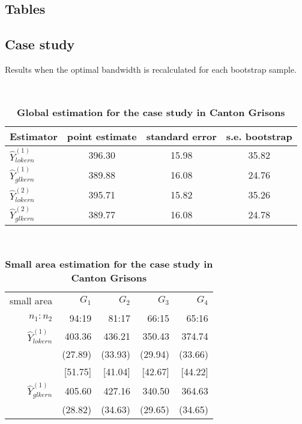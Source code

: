 \documentclass[a4paper,12pt,leqno, titlepage]{article}
\begin{document}
\begin{appendix}
{{{\section{Tables}\label{appendixtables}

 \subsection{Case study}\label{appendixtablescasestudy}
 Results when the optimal bandwidth is recalculated for each bootstrap sample.

 \begin{table}[h]
\centering
\caption{ \label{appcasestudy1}\textbf{Global estimation for the case study in Canton Grisons}}\\[0.5cm]
\small
 \begin{tabular}{lccc}\hline
  Estimator & point estimate & standard error   & s.e. bootstrap \\ \hline\hline
 $\hat{Y}^{(1)}_{lokern}$  & 396.30  & 15.98    & 35.82 \\ \hline
 $\hat{Y}^{(1)}_{glkern}$  & 389.88  & 16.08    & 24.76 \\ \hline\hline
 $\hat{Y}^{(2)}_{lokern}$  & 395.71  & 15.82    & 35.26 \\ \hline
 $\hat{Y}^{(2)}_{glkern}$  & 389.77  & 16.08    & 24.78 \\ \hline\hline
 \end{tabular}
 \end{table}
\normalsize
\begin{table}[ht]
\centering
\caption{ \label{appcasestudy2}\textbf{Small area estimation for the case study in Canton Grisons}}\\[0.5cm]
\small
\begin{tabular}{rrrrr}
  \hline
small area               & $G_1$ & $G_2$ & $G_3$ & $G_4$ \\
$n_1:n_2$                & 94:19   & 81:17   & 66:15   & 65:16 \\ \hline\hline
$\hat{Y}^{(1)}_{lokern}$ & 403.36  & 436.21  & 350.43  & 374.74 \\
                         & (27.89) & (33.93) & (29.94) & (33.66) \\
                         & [51.75] & [41.04] & [42.67] & [44.22] \\ \hline
$\hat{Y}^{(1)}_{glkern}$ & 405.60  & 427.16  & 340.50  & 364.63 \\
                         & (28.82) & (34.63) & (29.65) & (34.65) \\

\end{tabular}
\end{table}}}}
\end{appendix}
\end{document}
